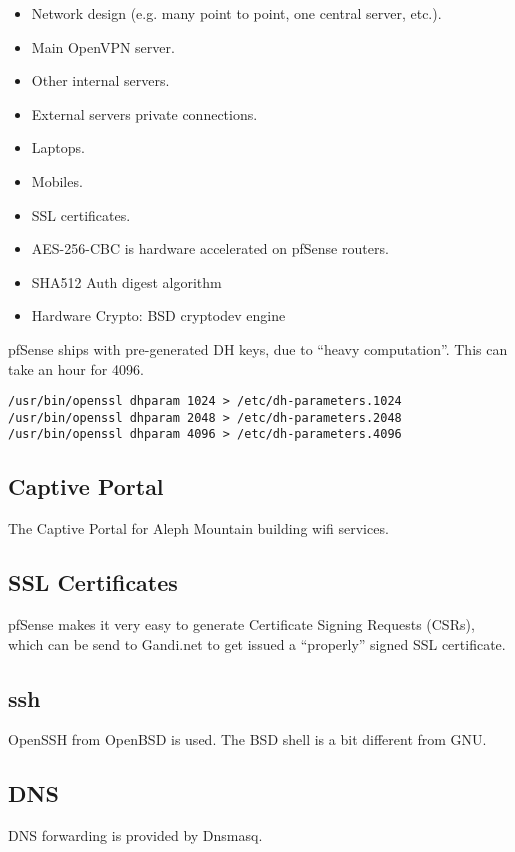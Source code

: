 \begin{itemize}
 \item Network design (e.g. many point to point, one central server, etc.).
 \item Main OpenVPN server.
 \item Other internal servers.
 \item External servers private connections.
 \item Laptops.
 \item Mobiles.
 \item SSL certificates.
 \item AES-256-CBC is hardware accelerated on pfSense routers.
 \item SHA512 Auth digest algorithm
 \item Hardware Crypto: BSD cryptodev engine
\end{itemize}


pfSense ships with pre-generated DH keys, due to ``heavy computation''.
This can take an hour for 4096.
\begin{verbatim}
/usr/bin/openssl dhparam 1024 > /etc/dh-parameters.1024
/usr/bin/openssl dhparam 2048 > /etc/dh-parameters.2048
/usr/bin/openssl dhparam 4096 > /etc/dh-parameters.4096
\end{verbatim}



\subsection{Captive Portal}
The Captive Portal for Aleph Mountain building wifi services.


\subsection{SSL Certificates}
pfSense makes it very easy to generate Certificate Signing Requests (CSRs),
which can be send to Gandi.net to get issued a ``properly'' signed SSL
certificate.


\subsection{ssh}
OpenSSH from OpenBSD is used. The BSD shell is a bit different from GNU.


\subsection{DNS}
DNS forwarding is provided by Dnsmasq.

